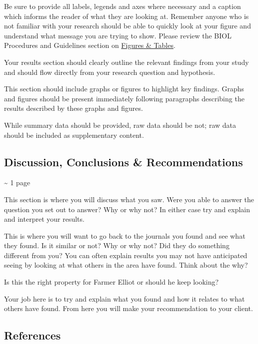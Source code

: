 \documentclass[
]{book}
\begin{document}
Be sure to provide all labels, legends and axes where necessary and a caption which informs the reader of what they are looking at. Remember anyone who is not familiar with your research should be able to quickly look at your figure and understand what message you are trying to show. Please review the BIOL Procedures and Guidelines section on \href{https://ubco-biology.github.io/Procedures-and-Guidelines/figures-tables.html}{Figures \& Tables}.

Your results section should clearly outline the relevant findings from your study and should flow directly from your research question and hypothesis.

This section should include graphs or figures to highlight key findings. Graphs and figures should be present immediately following paragraphs describing the results described by these graphs and figures.

While summary data should be provided, raw data should be not; raw data should be included as supplementary content.

\hypertarget{discussion-conclusions-recommendations}{%
\subsection*{Discussion, Conclusions \& Recommendations}\label{discussion-conclusions-recommendations}}

\textasciitilde{} 1 page

This section is where you will discuss what you saw. Were you able to answer the question you set out to answer? Why or why not? In either case try and explain and interpret your results.

This is where you will want to go back to the journals you found and see what they found. Is it similar or not? Why or why not? Did they do something different from you? You can often explain results you may not have anticipated seeing by looking at what others in the area have found. Think about the why?

Is this the right property for Farmer Elliot or should he keep looking?

Your job here is to try and explain what you found and how it relates to what others have found. From here you will make your recommendation to your client.

\hypertarget{references}{%
\subsection*{References}\label{references}}
\end{document}
